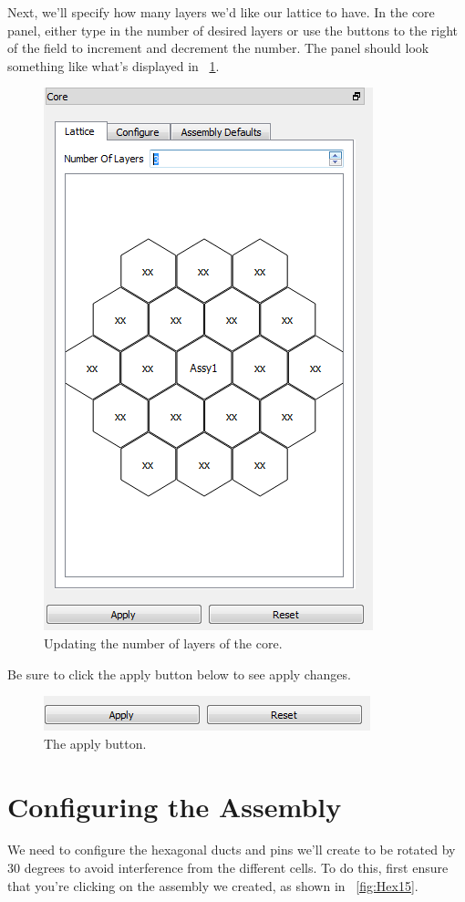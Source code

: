 Next, we'll specify how many layers we'd like our lattice to have.  In the core panel, either type in the number of desired layers or use the buttons to the right of the field to increment and decrement the number.  The panel should look something like what's displayed in ~\ref{fig:Hex3}.

\begin{figure}[H]
	\begin{center}
		\includegraphics[width=0.5\linewidth]{Images/hex-3.png}
		\caption{Updating the number of layers of the core.}
		\label{fig:Hex3}
	\end{center}
\end{figure}

Be sure to click the apply button below to see apply changes.

\begin{figure}[H]
	\begin{center}
		\includegraphics[width=0.5\linewidth]{Images/hex-4.png}
		\caption{The apply button.}
		\label{fig:Hex4}
	\end{center}
\end{figure}

\section{Configuring the Assembly}
We need to configure the hexagonal ducts and pins we'll create to be rotated by 30 degrees to avoid interference from the different cells.  To do this, first ensure that you're clicking on the assembly we created, as shown in ~\ref{fig:Hex15}.

